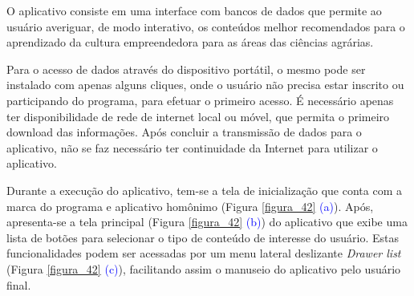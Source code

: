 O aplicativo consiste em uma interface com bancos de dados que permite ao usuário averiguar, de modo interativo, os conteúdos melhor recomendados para o aprendizado da cultura empreendedora para as áreas das ciências agrárias. 

Para o acesso de dados através do dispositivo portátil, o mesmo pode ser instalado com apenas alguns cliques, onde o usuário não precisa estar inscrito ou participando do programa, para efetuar o primeiro acesso. É necessário apenas ter disponibilidade de rede de internet local ou móvel, que permita o primeiro download das informações. Após concluir a transmissão de dados para o aplicativo, não se faz necessário ter continuidade da Internet para utilizar o aplicativo.

Durante a execução do aplicativo, tem-se a tela de inicialização que conta com a marca do programa e aplicativo homônimo (Figura \ref{figura_42} \textcolor{blue}{(a)}). 
Após, apresenta-se a tela principal (Figura \ref{figura_42} \textcolor{blue}{(b)}) do aplicativo que exibe uma lista de botões para selecionar o tipo de conteúdo de interesse do usuário. Estas funcionalidades podem ser acessadas por um menu lateral deslizante \textit{Drawer list} (Figura \ref{figura_42} \textcolor{blue}{(c)}), facilitando assim o manuseio do aplicativo pelo usuário final. 


